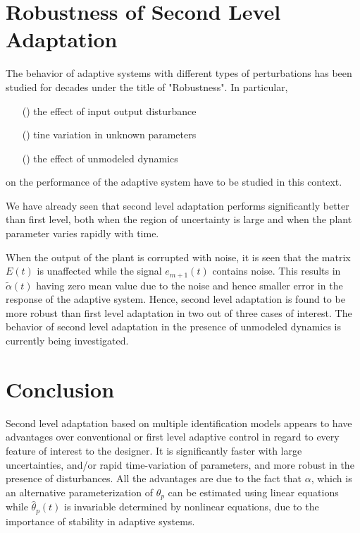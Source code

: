 \documentclass[conference]{IEEEtran}
\begin{document}
\section{Robustness of Second Level Adaptation}
The behavior of adaptive systems with different types of perturbations has been studied for decades under the title of "Robustness". In particular,
\begin{itemize}
\item [(\expandafter{\romannumeral1})] the effect of input output disturbance
\item [(\expandafter{\romannumeral2})] tine variation in unknown parameters
\item [(\expandafter{\romannumeral3})] the effect of unmodeled dynamics
\end{itemize}
on the performance of the adaptive system have to be studied in this context.

We have already seen that second level adaptation performs significantly better than first level, both when the region of uncertainty is large and when the plant parameter varies rapidly with time.

When the output of the plant is corrupted with noise, it is seen that the matrix $E(t)$ is unaffected while the signal $e_{m+1}(t)$ contains noise. This results in $\tilde{\alpha}(t)$ having zero mean value due to the noise and hence smaller error in the response of the adaptive system. Hence, second level adaptation is found to be more robust than first level adaptation in two out of three cases of interest. The behavior of second level adaptation in the presence of unmodeled dynamics is currently being investigated.

\section{Conclusion}
Second level adaptation based on multiple identification models appears to have advantages over conventional or first level adaptive control in regard to every feature of interest to the designer. It is significantly faster with large uncertainties, and/or rapid time-variation of parameters, and more robust in the presence of disturbances. All the advantages are due to the fact that $\alpha$, which is an alternative parameterization of $\theta_{p}$ can be estimated using linear equations while $\hat{\theta}_{p}(t)$ is invariable determined by nonlinear equations, due to the importance of stability in adaptive systems.
\end{document}
